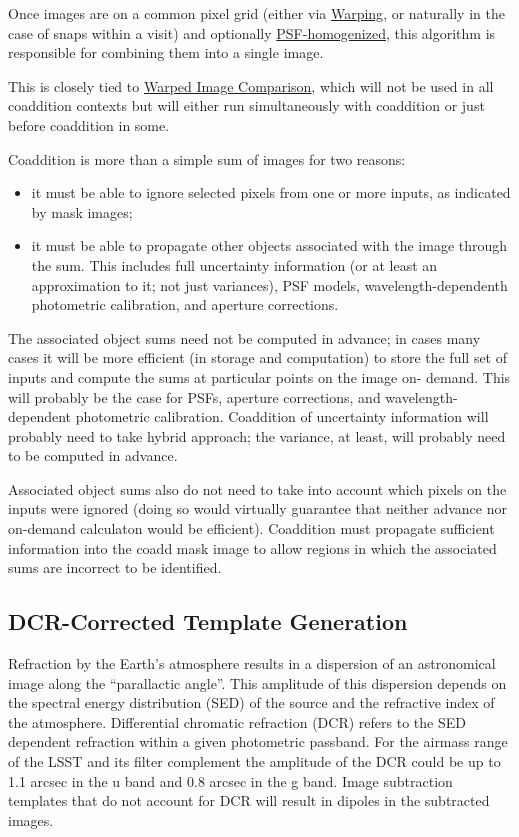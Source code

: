 Once images are on a common pixel grid (either via
\hyperref[sec:spWarping]{Warping}, or naturally in the case of snaps within a
visit) and optionally \hyperref[sec:acPSFHomogenization]{PSF-homogenized},
this algorithm is responsible for combining them into a single image.

This is closely tied to \hyperref[sec:acWarpedImageArtifactDetection]{Warped
Image Comparison}, which will not be used in all coaddition contexts but will
either run simultaneously with coaddition or just before coaddition in some.

Coaddition is more than a simple sum of images for two reasons:
\begin{itemize}
    \item it must be able to ignore selected pixels from one or more inputs, as indicated by mask images;
    \item it must be able to propagate other objects associated with the image through the sum.  This includes full uncertainty information (or at least an approximation to it; not just variances), PSF models, wavelength-dependenth photometric calibration, and aperture corrections.
\end{itemize}

The associated object sums need not be computed in advance; in cases many
cases it will be more efficient (in storage and computation) to store the
full set of inputs and compute the sums at particular points on the image on-
demand.  This will probably be the case for PSFs, aperture corrections, and
wavelength-dependent photometric calibration.  Coaddition of uncertainty
information will probably need to take hybrid approach; the variance, at
least, will probably need to be computed in advance.

Associated object sums also do not need to take into account which pixels on
the inputs were ignored (doing so would virtually guarantee that neither
advance nor on-demand calculaton would be efficient).  Coaddition must
propagate sufficient information into the coadd mask image to allow regions
in which the associated sums are incorrect to be identified.

\subsection{DCR-Corrected Template Generation}
\label{sec:acDCRTemplates}

Refraction by the Earth's atmosphere results in a dispersion of an
astronomical image along the ``parallactic angle''. This amplitude of
this dispersion depends on the spectral energy distribution (SED) of
the source and the refractive index of the atmosphere. Differential
chromatic refraction (DCR) refers to the SED dependent refraction
within a given photometric passband. For the airmass range of the LSST
and its filter complement the amplitude of the DCR could be up to 1.1
arcsec in the u band and 0.8 arcsec in the g band. Image subtraction
templates that do not account for DCR will result in dipoles in the
subtracted images.


